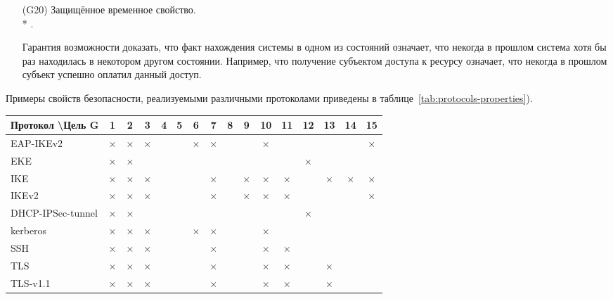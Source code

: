 \begin{itemize}
	\item[(G20)] Защищённое временное свойство.\\*
		.
	\item[{}] Гарантия возможности доказать, что факт нахождения системы в одном из состояний означает, что некогда в прошлом система хотя бы раз находилась в некотором другом состоянии. Например, что получение субъектом доступа к ресурсу означает, что некогда в прошлом субъект успешно оплатил данный доступ.

\end{itemize}

Примеры свойств безопасности, реализуемыми различными протоколами приведены в таблице~\ref{tab:protocols-properties}).

\begin{landscape}
{\renewcommand{\arraystretch}{1.5}
\begin{table}
    \centering
    \begin{tabular}{|l|c|c|c|c|c|c|c|c|c|c|c|c|c|c|c|}
        \hline
Протокол \textbackslash Цель G & 1 & 2 & 3 & 4 & 5 & 6 & 7 & 8 & 9 & 10 & 11 & 12 & 13 & 14 & 15 \\
        \hline
        EAP-IKEv2              & × & × & × &   &   & × & × &   &   &  × &    &    &    &    &  × \\
        \hline
        EKE                    & × & × &   &   &   &   &   &   &   &    &    &  × &    &    &    \\
        \hline
        IKE                    & × & × & × &   &   &   & × &   & × &  × &  × &    &  × &  × &  × \\
        \hline
        IKEv2                  & × & × & × &   &   &   & × &   & × &  × &  × &    &    &    &  × \\
        \hline
        DHCP-IPSec-tunnel      & × & × &   &   &   &   &   &   &   &    &    &  × &    &    &    \\
        \hline
        kerberos               & × & × & × &   &   & × & × &   &   &  × &    &    &    &    &    \\
        \hline
        SSH                    & × & × & × &   &   &   & × &   &   &  × &  × &    &    &    &    \\
        \hline
        TLS                    & × & × & × &   &   &   & × &   &   &  × &  × &    &  × &    &    \\
        \hline
        TLS-v1.1               & × & × & × &   &   &   & × &   &   &  × &  × &    &  × &    &    \\

\end{tabular}
\end{table}}
\end{landscape}

